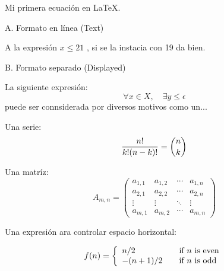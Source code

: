 \documentclass{article}
\begin{document}
Mi primera ecuación en LaTeX.
\newline

A. Formato en línea (Text)

A la expresión 
\( x \leq 21 \) 
, si se la instacia con 19 da bien.
\newline

B. Formato separado (Displayed)
\newline

La siguiente expresión:
\[
 \forall x \in X, \quad \exists y \leq \epsilon
\]
puede ser connsiderada por diversos motivos como un...
\newline

Una serie:
\[
 {n! \over k!(n-k)!} = {n \choose k}
\]

Una matríz:
\[
 A_{m,n} =
 \begin{pmatrix}
  a_{1,1} & a_{1,2} & \cdots & a_{1,n} \\
  a_{2,1} & a_{2,2} & \cdots & a_{2,n} \\
  \vdots  & \vdots  & \ddots & \vdots  \\
  a_{m,1} & a_{m,2} & \cdots & a_{m,n}
 \end{pmatrix}
\]

Una expresión ara controlar espacio horizontal:

\[
  f(n) = \left\{ 
  \begin{array}{l l}
    n/2 & \quad \text{if $n$ is even}\\
    -(n+1)/2 & \quad \text{if $n$ is odd}\\
  \end{array} \right.
\]
\end{document}
